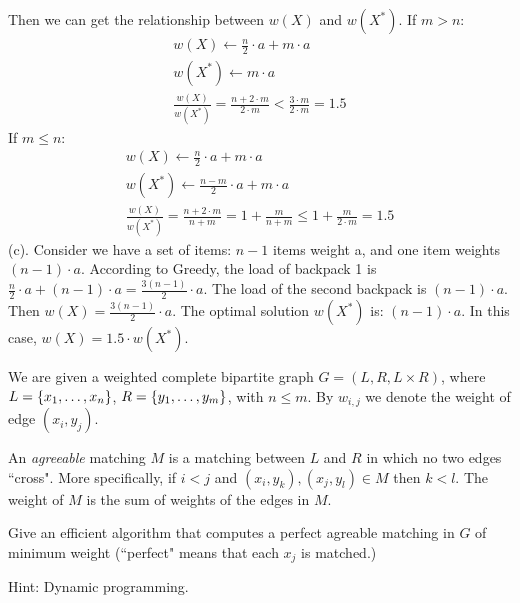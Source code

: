 \documentclass[11pt]{article}
\newcommand{\Greedy}{\mbox{\sc Greedy}}
\begin{document}
Then we can get the relationship between $w(X)$ and $w(X^\ast)$.\newline
If $m > n$:
\begin{gather*}
    w(X) \gets \frac{n}{2} \cdot a + m \cdot a  \\
    w(X^\ast) \gets m \cdot a                   \\
    \frac{w(X)}{w(X^\ast)} = \frac{n + 2 \cdot m}{2 \cdot m} < \frac{3 \cdot m}{2 \cdot m} = 1.5
\end{gather*}
If $m \leq n$:
\begin{gather*}
    w(X) \gets \frac{n}{2} \cdot a + m \cdot a          \\
    w(X^\ast) \gets \frac{n-m}{2} \cdot a + m \cdot a   \\
    \frac{w(X)}{w(X^\ast)} = \frac{n + 2 \cdot m}{n + m} = 1 + \frac{m}{n + m} \leq 1 + \frac{m}{2 \cdot m} = 1.5
\end{gather*}
(c). Consider we have a set of items: $n-1$ items weight a, and one item weights $(n-1) \cdot a$. \newline
According to {\Greedy}, the load of backpack 1 is $\frac{n}{2} \cdot a + (n-1) \cdot a = \frac{3(n-1)}{2} \cdot a$. The load of  the second backpack is $(n-1) \cdot a$. Then $w(X) = \frac{3(n-1)}{2} \cdot a$.
The optimal solution $w(X^\ast)$ is: $(n-1) \cdot a$. \newline
In this case, $w(X) = 1.5\cdot w(X^\ast)$.


\begin{problem}
We are given a weighted complete bipartite graph $G = (L,R,L\times R)$, where $L = {\left\{ x_1,\dots,x_n \right\} }$, $R = {\left\{  y_1,\dots,y_m \right\} }$, with $n \le m$. By $w_{i,j}$ we denote the weight of edge $(x_i,y_j)$.

An \emph{agreeable} matching $M$ is a matching between $L$ and $R$ in which no two edges ``cross". More specifically, if $i<j$ and $(x_i,y_k), (x_j,y_l)\in M$ then $k < l$. The weight of $M$ is the sum of weights of the edges in $M$.

Give an efficient algorithm that computes a perfect agreable matching in $G$ of minimum weight (``perfect" means that each $x_j$ is matched.)

\noindent Hint: Dynamic programming.
\end{problem}
\end{document}
